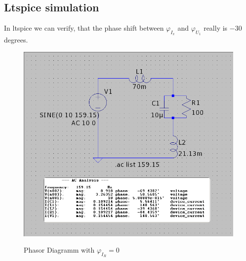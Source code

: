\documentclass[a4paper]{article}
\begin{document}
\subsection{Ltspice simulation}
In ltspice we can verify, that the phase shift between $\varphi_{I_{x}}$ and $\varphi_{U_{1}}$
really is $-30$ degrees. \\
\begin{figure}[h!]
	\centering
	\includegraphics[scale=0.55]{./Figures/assignment5_sim_aclist.png}
	\label{sim_1}
	\caption{Phasor Diagramm with $\varphi_{I_{R}} = 0$}
\end{figure}
\end{document}
